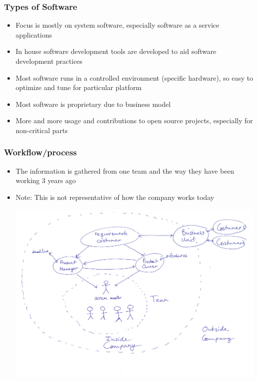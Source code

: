 \documentclass{beamer}
\begin{document}
\begin{frame}
  \frametitle{Types of Software}
  \begin{itemize}
  \item Focus is mostly on system software, especially software as a service applications
  \item In house software development tools are developed to aid software development practices
  \item Most software runs in a controlled environment (specific hardware), so easy to optimize and tune for particular platform
  \item Most software is proprietary due to business model
  \item More and more usage and contributions to open source projects, especially for non-critical parts
  \end{itemize}
\end{frame}

\begin{frame}
  \frametitle{Workflow/process}
  \begin{itemize}
  \item The information is gathered from one team and the way they have been working 3 years ago
  \item Note: This is not representative of how the company works today
  \begin{center}
    \includegraphics[width=1\textwidth]{figs/scrum_setup.pdf}
  \end{center}
  \end{itemize}

\end{frame}
\end{document}
